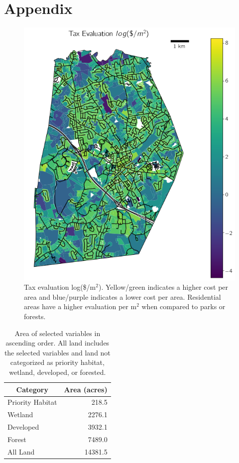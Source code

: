 \documentclass[12pt, stu, floatsintext,table]{apa7}
\begin{document}

\section{Appendix}

\begin{figure}[hbtp]
    \centering
    \includegraphics[width=0.75\linewidth]{figures/landval.png}
    \caption{Tax evaluation log(\$/m$^2$). Yellow/green indicates a higher cost per area and blue/purple indicates a lower cost per area. Residential areas have a higher evaluation per m$^2$ when compared to parks or forests. }
\end{figure}

\begin{table}[]
\centering
\caption{Area of selected variables in ascending order. All land includes the selected variables and land not categorized as priority habitat, wetland, developed, or forested. }
\begin{tabular}{@{}lr@{}}
\toprule
\multicolumn{1}{c}{Category} & \multicolumn{1}{c}{Area (acres)} \\ \midrule
Priority Habitat             & 218.5                            \\
Wetland                      & 2276.1                           \\
Developed                    & 3932.1                           \\
Forest                       & 7489.0                           \\
All Land                     & 14381.5                          \\ \bottomrule
\end{tabular}
\end{table}
\end{document}
